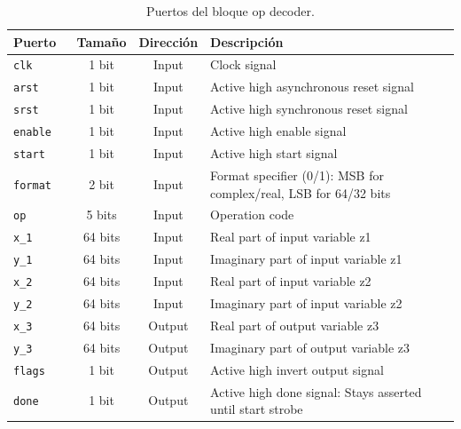 \documentclass[10pt,a4paper]{book}
\begin{document}
      \begin{table}[h]
      \centering
      \begin{tabular}{lccl}
         \hline
         Puerto            &  Tama\~no    &  Direcci\'on    &  Descripci\'on                                                  \\ \hline \hline
         \verb|clk      |  &  1  bit      &  Input          &  Clock signal                                                   \\ \hline
         \verb|arst     |  &  1  bit      &  Input          &  Active high asynchronous reset signal                          \\ \hline
         \verb|srst     |  &  1  bit      &  Input          &  Active high synchronous reset signal                           \\ \hline
         \verb|enable   |  &  1  bit      &  Input          &  Active high enable signal                                      \\ \hline
         \verb|start    |  &  1  bit      &  Input          &  Active high start signal                                       \\ \hline
         \verb|format   |  &  2  bit      &  Input          &  Format specifier (0/1): MSB for complex/real, LSB for 64/32 bits\\ \hline
         \verb|op       |  &  5  bits     &  Input          &  Operation code                                                 \\ \hline
         \verb|x_1      |  &  64 bits     &  Input          &  Real      part of input variable z1                            \\ \hline
         \verb|y_1      |  &  64 bits     &  Input          &  Imaginary part of input variable z1                            \\ \hline
         \verb|x_2      |  &  64 bits     &  Input          &  Real      part of input variable z2                            \\ \hline
         \verb|y_2      |  &  64 bits     &  Input          &  Imaginary part of input variable z2                            \\ \hline
         \verb|x_3      |  &  64 bits     &  Output         &  Real      part of output variable z3                           \\ \hline
         \verb|y_3      |  &  64 bits     &  Output         &  Imaginary part of output variable z3                           \\ \hline
         \verb|flags    |  &  1  bit      &  Output         &  Active high invert output signal                               \\ \hline
         \verb|done     |  &  1  bit      &  Output         &  Active high done signal: Stays asserted until start strobe     \\ \hline
      \end{tabular}
      \caption{Puertos del bloque op decoder.}
      \label{tab:bkm_fixed_ports}
      \end{table}
\end{document}
